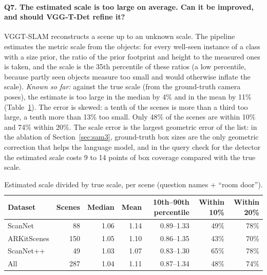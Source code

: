 \paragraph{Q7. The estimated scale is too large on average. Can it be improved, and should VGG-T-Det refine it?}
VGGT-SLAM reconstructs a scene up to an unknown scale. The pipeline estimates the metric scale from the objects:
for every well-seen instance of a class with a size prior, the ratio of the prior footprint and height to the
measured ones is taken, and the scale is the 35th percentile of these ratios (a low percentile, because partly
seen objects measure too small and would otherwise inflate the scale).
\emph{Known so far:} against the true scale (from the ground-truth camera poses), the estimate is too large in
the median by 4\% and in the mean by 11\% (Table~\ref{tab:sam3-q7}). The error is skewed: a tenth of the scenes
is more than a third too large, a tenth more than 13\% too small. Only 48\% of the scenes are within 10\% and
74\% within 20\%. The scale error is the largest geometric error of the list: in the ablation of
Section~\ref{sec:sam3}, ground-truth box sizes are the only geometric correction that helps the language model,
and in the query check for the detector the estimated scale costs 9 to 14 points of box coverage compared with
the true scale.

\begin{table}[t]
\centering
\caption{Estimated scale divided by true scale, per scene (question names + ``room door'').}
\label{tab:sam3-q7}
\begin{tabular}{lrrrrrr}
\toprule
Dataset & Scenes & Median & Mean & 10th--90th percentile & Within 10\% & Within 20\% \\
\midrule
ScanNet     &  88 & 1.06 & 1.14 & 0.89--1.33 & 49\% & 78\% \\
ARKitScenes & 150 & 1.05 & 1.10 & 0.86--1.35 & 43\% & 70\% \\
ScanNet++   &  49 & 1.03 & 1.07 & 0.83--1.30 & 65\% & 78\% \\
All         & 287 & 1.04 & 1.11 & 0.87--1.34 & 48\% & 74\% \\
\bottomrule
\end{tabular}
\end{table}


